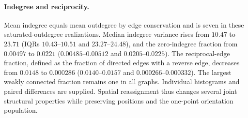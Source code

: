 \documentclass[11pt]{article}
\begin{document}
\paragraph*{Indegree and reciprocity.}
Mean indegree equals mean outdegree by edge conservation and is seven in these saturated-outdegree realizations. Median indegree variance rises from $10.47$ to $23.71$ (IQRs $10.43$--$10.51$ and $23.27$--$24.48$), and the zero-indegree fraction from $0.00497$ to $0.0221$ ($0.00485$--$0.00512$ and $0.0205$--$0.0225$). The reciprocal-edge fraction, defined as the fraction of directed edges with a reverse edge, decreases from $0.0148$ to $0.000286$ ($0.0140$--$0.0157$ and $0.000266$--$0.000332$). The largest weakly connected fraction remains one in all graphs. Individual histograms and paired differences are supplied. Spatial reassignment thus changes several joint structural properties while preserving positions and the one-point orientation population.



\FloatBarrier
\end{document}
